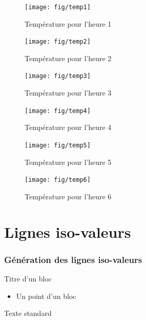 \documentclass{beamer}
\begin{document}
\begin{frame} \frametitle{}

  \begin{overprint}

     \begin{figure}
      \centering
      \texttt{[image: fig/temp1]}
      \caption{Température pour l'heure 1}
    \end{figure}

     \begin{figure}
      \centering
      \texttt{[image: fig/temp2]}
      \caption{Température pour l'heure 2}
    \end{figure}

     \begin{figure}
      \centering
      \texttt{[image: fig/temp3]}
      \caption{Température pour l'heure 3}
    \end{figure}

     \begin{figure}
      \centering
      \texttt{[image: fig/temp4]}
      \caption{Température pour l'heure 4}
    \end{figure}

     \begin{figure}
      \centering
      \texttt{[image: fig/temp5]}
      \caption{Température pour l'heure 5}
    \end{figure}

     \begin{figure}
      \centering
      \texttt{[image: fig/temp6]}
      \caption{Température pour l'heure 6}
    \end{figure}

  \end{overprint}

\end{frame}


\section[Isovaleurs]{Lignes iso-valeurs}

\begin{frame}
  \frametitle{Génération des lignes iso-valeurs}
  \begin{block}{Titre d'un bloc}
    \begin{itemize}
      \item Un point d'un bloc
    \end{itemize}
    Texte standard
  \end{block}



    \begin{overlayarea}{6cm}{1cm}
 \end{overlayarea}
\end{frame}
\end{document}
